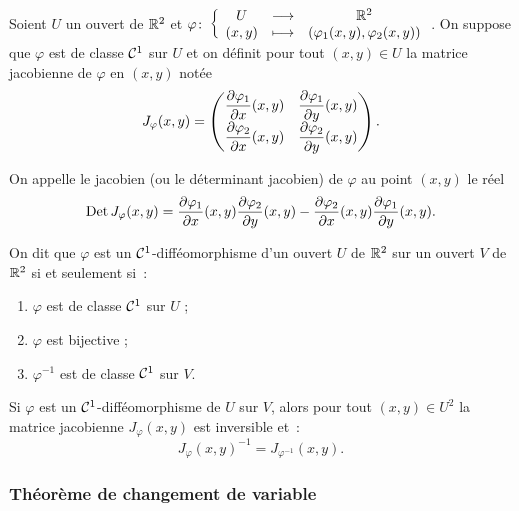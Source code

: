 \begin{defdef}
  Soient \(U\) un ouvert de \(\mathbb{R}^2\) et 
  \(\varphi\colon\left\{\begin{array}{ccc}U & \longrightarrow &\mathbb{R}^2\\(x,y) & \longmapsto & (\varphi_1(x,y),\varphi_2(x,y))\end{array}\right.\). On 
  suppose que \(\varphi\) est de classe \(\mathcal{C}^{1}\) sur \(U\) et on définit 
  pour tout \((x,y) \in U\) la matrice jacobienne de \(\varphi\) en \((x,y)\) 
  notée
  \begin{equation}
    J_\varphi(x,y) = \begin{pmatrix} \dfrac{\partial{} \varphi_1}{\partial{} x}(x,y) & 
    \dfrac{\partial{} \varphi_1}{\partial{} y}(x,y) \\ \dfrac{\partial{} \varphi_2}{\partial{} x}(x,y) & 
    \dfrac{\partial{} \varphi_2}{\partial{} y}(x,y) \end{pmatrix}.
  \end{equation}

  On appelle le jacobien (ou le déterminant jacobien) de \(\varphi\) au point 
  \((x,y)\) le réel
  \begin{equation}
    \operatorname{Det} J_\varphi(x,y) = \dfrac{\partial{} \varphi_1}{\partial{} x}(x,y) 
    \dfrac{\partial{} \varphi_2}{\partial{} y}(x,y) - \dfrac{\partial{} \varphi_2}{\partial{} x}(x,y) 
    \dfrac{\partial{} \varphi_1}{\partial{} y}(x,y).
  \end{equation}
\end{defdef}
%
\begin{defdef}
  On dit que \(\varphi\) est un \(\mathcal{C}^{1}\)-difféomorphisme d'un ouvert \(U\) 
  de \(\mathbb{R}^2\) sur un ouvert \(V\) de \(\mathbb{R}^2\) si et seulement si~:
  \begin{enumerate}
    \item \(\varphi\) est de classe \(\mathcal{C}^{1}\) sur \(U\) ;
    \item \(\varphi\) est bijective ;
    \item \(\varphi^{-1}\) est de classe \(\mathcal{C}^{1}\) sur \(V\).
  \end{enumerate}
\end{defdef}
%
\begin{prop}[Admise]
  Si \(\varphi\) est un \(\mathcal{C}^{1}\)-difféomorphisme de \(U\) sur \(V\), alors 
  pour tout \((x,y) \in U^2\) la matrice jacobienne \(J_\varphi(x,y)\) est 
  inversible et~:
  \begin{equation}
    J_\varphi(x,y)^{-1} = J_{\varphi^{-1}}(x,y).
  \end{equation}
\end{prop}

\subsubsection{Théorème de changement de variable}

